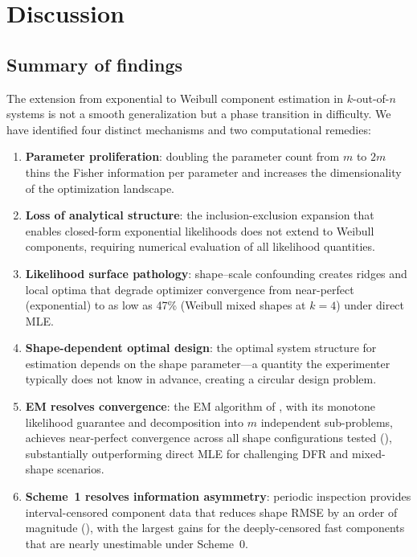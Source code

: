 \documentclass[12pt]{article}
\theoremstyle{definition}
\theoremstyle{remark}
\begin{document}
\section{Discussion}
\label{sec:discussion}

\subsection{Summary of findings}

The extension from exponential to Weibull component estimation in
$k$-out-of-$n$ systems is not a smooth generalization but a phase
transition in difficulty.  We have identified four distinct
mechanisms and two computational remedies:

\begin{enumerate}
\item \textbf{Parameter proliferation}: doubling the parameter
  count from $m$ to $2m$ thins the Fisher information per parameter
  and increases the dimensionality of the optimization landscape.

\item \textbf{Loss of analytical structure}: the
  inclusion-exclusion expansion that enables closed-form
  exponential likelihoods does not extend to Weibull components,
  requiring numerical evaluation of all likelihood quantities.

\item \textbf{Likelihood surface pathology}: shape--scale
  confounding creates ridges and local optima that degrade
  optimizer convergence from near-perfect (exponential) to as low
  as 47\% (Weibull mixed shapes at $k = 4$) under direct MLE.

\item \textbf{Shape-dependent optimal design}: the optimal system
  structure for estimation depends on the shape parameter---a
  quantity the experimenter typically does not know in advance,
  creating a circular design problem.

\item \textbf{EM resolves convergence}: the EM algorithm of
  , with its monotone likelihood guarantee
  and decomposition into $m$ independent sub-problems, achieves
  near-perfect convergence across all shape configurations
  tested (), substantially outperforming
  direct MLE for challenging DFR and mixed-shape scenarios.

\item \textbf{Scheme~1 resolves information asymmetry}: periodic
  inspection provides interval-censored component data that reduces
  shape RMSE by an order of magnitude
  (), with the largest gains for the
  deeply-censored fast components that are nearly unestimable under
  Scheme~0.
\end{enumerate}
\end{document}
